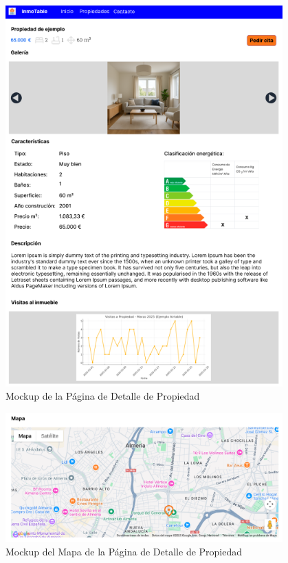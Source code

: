 \begin{figure}[H]
    \begin{center}
        \includegraphics[width = 0.95\textwidth]{Figuras/mockup_3_detalle_propiedad.png}
    \end{center}
    \caption{\label{fig:mockup_3_detalle_propiedad} Mockup de la Página de Detalle de Propiedad}
\end{figure}

\begin{figure}[H]
    \begin{center}
        \includegraphics[width = 0.95\textwidth]{Figuras/mockup_3_detalle_propiedad_mapa.png}
    \end{center}
    \caption{\label{fig:mockup_3_detalle_propiedad_mapa} Mockup del Mapa de la Página de Detalle de Propiedad}
\end{figure}


